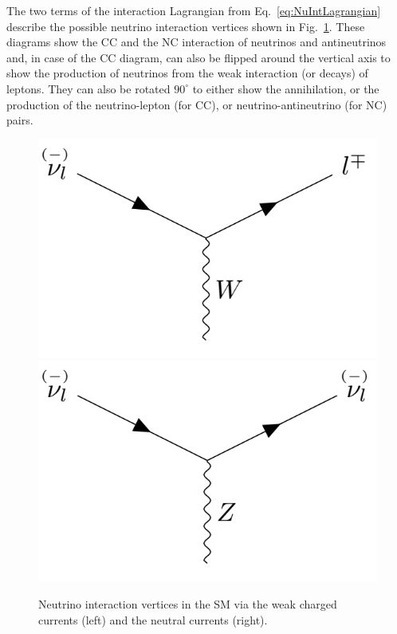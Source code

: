 The two terms of the interaction Lagrangian from Eq.~\ref{eq:NuIntLagrangian} describe the possible neutrino interaction vertices shown in Fig.~\ref{fig:FeynmanNuIntVertices}. These diagrams show the \gls{CC} and the \gls{NC} interaction of neutrinos and antineutrinos and, in case of the \gls{CC} diagram, can also be flipped around the vertical axis to show the production of neutrinos from the weak interaction (or decays) of leptons. They can also be rotated $90^{\circ}$ to either show the annihilation, or the production of the neutrino-lepton (for \gls{CC}), or neutrino-antineutrino (for \gls{NC}) pairs.

\begin{figure}[hbtp]
\centering
\includegraphics[width=.4\linewidth]{Plots/Theory/NeutrinoCCInteractionVertices.png}
\hspace{0.1\linewidth}
\includegraphics[width=.4\linewidth]{Plots/Theory/NeutrinoNCInteractionVertices.png}
\caption[Neutrino interaction vertices in the SM]{Neutrino interaction vertices in the \acrshort{SM} via the weak charged currents (left) and the neutral currents (right).}
\label{fig:FeynmanNuIntVertices}
\end{figure}




